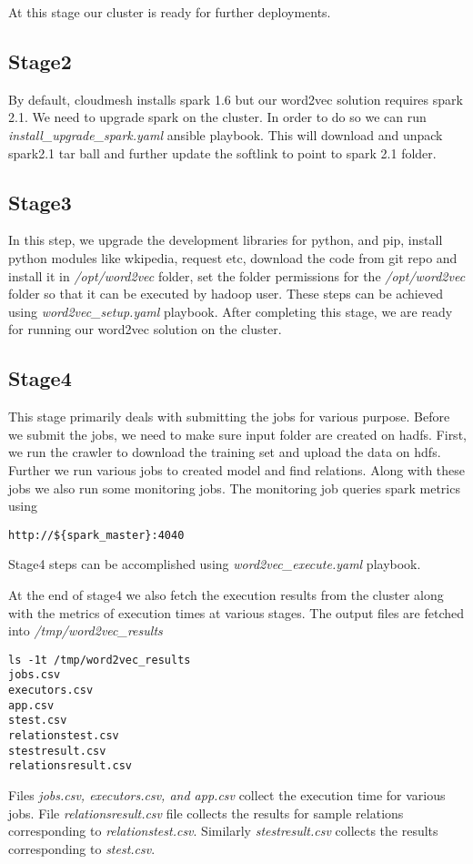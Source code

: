 At this stage our cluster is ready for further deployments.

\subsection{Stage2} \label{deploymentstage2}  
By default, cloudmesh installs spark 1.6 but our word2vec solution requires
spark 2.1. We need to upgrade spark on the cluster. In order to do so we can run 
\textit{install\_upgrade\_spark.yaml} ansible\cite{www-ansible} playbook. This will download and unpack spark2.1 
tar ball and further update the softlink to point to spark 2.1 folder.

\subsection{Stage3} \label{deploymentstage3} 
In this step, we upgrade the development libraries for python, and pip,
install python modules like wkipedia, request etc, download the code from git repo and
install it in \textit{/opt/word2vec} folder, set the folder permissions for the \textit{/opt/word2vec} folder
so that it can be executed by hadoop user. These steps can be achieved using 
\textit{word2vec\_setup.yaml} playbook. After completing this stage, we are ready for running
our word2vec solution on the cluster. 

\subsection{Stage4} \label{deploymentstage4} 
This stage primarily deals with submitting the jobs for various purpose. 
Before we submit the jobs, we need to make sure input folder are created on hadfs.
First, we run the crawler to download the training set and upload the data on hdfs.
Further we run various jobs to created model and find relations. Along with these jobs
we also run some monitoring jobs. The monitoring job queries spark metrics using 
\begin{verbatim}
http://${spark_master}:4040
\end{verbatim}

Stage4 steps can be accomplished using \textit{word2vec\_execute.yaml} playbook. 

At the end of stage4 we also fetch the execution results from the cluster along with the 
metrics of execution times at various stages. The output files are fetched into \textit{/tmp/word2vec\_results}
\begin{verbatim}
ls -1t /tmp/word2vec_results
jobs.csv
executors.csv
app.csv
stest.csv
relationstest.csv
stestresult.csv
relationsresult.csv
\end{verbatim}
Files \textit{jobs.csv, executors.csv, and app.csv} collect the execution time for various jobs. 
File \textit{relationsresult.csv} file collects the results for sample relations corresponding to
\textit{relationstest.csv}. Similarly \textit{stestresult.csv} collects the results corresponding to \textit{stest.csv}.

